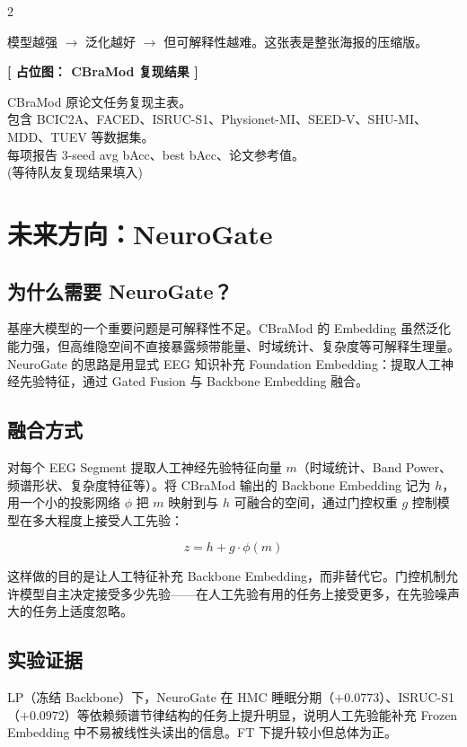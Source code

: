 \documentclass[12pt, a0paper]{article}
\renewcommand{\Large}{\fontsize{34}{42}\selectfont}
\renewcommand{\small}{\fontsize{18}{24}\selectfont}
\newcommand{\placeholder}[2]{%
    \begin{center}
    \colorbox{mygray!12}{\parbox{0.9\columnwidth}{%
        \centering
        \vspace{1.5em}
        {\Large\bfseries\color{mygray} [ 占位图： #1 ]}
        \vspace{1em}

        {\small\color{mygray} #2}
        \vspace{1.5em}
    }}
    \end{center}
}
\begin{document}
\begin{multicols}{2}
\vspace{1em}

模型越强 $\rightarrow$ 泛化越好 $\rightarrow$ 但可解释性越难。这张表是整张海报的压缩版。

\placeholder{CBraMod 复现结果}{%
    CBraMod 原论文任务复现主表。\\
    包含 BCIC2A、FACED、ISRUC-S1、Physionet-MI、SEED-V、SHU-MI、MDD、TUEV 等数据集。\\
    每项报告 3-seed avg bAcc、best bAcc、论文参考值。\\
    \small (等待队友复现结果填入)}

\section{未来方向：NeuroGate}

\subsection{为什么需要 NeuroGate？}

基座大模型的一个重要问题是可解释性不足。CBraMod 的 Embedding 虽然泛化能力强，但高维隐空间不直接暴露频带能量、时域统计、复杂度等可解释生理量。NeuroGate 的思路是用显式 EEG 知识补充 Foundation Embedding：提取人工神经先验特征，通过 Gated Fusion 与 Backbone Embedding 融合。

\subsection{融合方式}

对每个 EEG Segment 提取人工神经先验特征向量 $m$（时域统计、Band Power、频谱形状、复杂度特征等）。将 CBraMod 输出的 Backbone Embedding 记为 $h$，用一个小的投影网络 $\phi$ 把 $m$ 映射到与 $h$ 可融合的空间，通过门控权重 $g$ 控制模型在多大程度上接受人工先验：

\[
z = h + g \cdot \phi(m)
\]

这样做的目的是让人工特征补充 Backbone Embedding，而非替代它。门控机制允许模型自主决定接受多少先验——在人工先验有用的任务上接受更多，在先验噪声大的任务上适度忽略。

\subsection{实验证据}

LP（冻结 Backbone）下，NeuroGate 在 HMC 睡眠分期（$+0.0773$）、ISRUC-S1（$+0.0972$）等依赖频谱节律结构的任务上提升明显，说明人工先验能补充 Frozen Embedding 中不易被线性头读出的信息。FT 下提升较小但总体为正。


\end{multicols}
\end{document}
